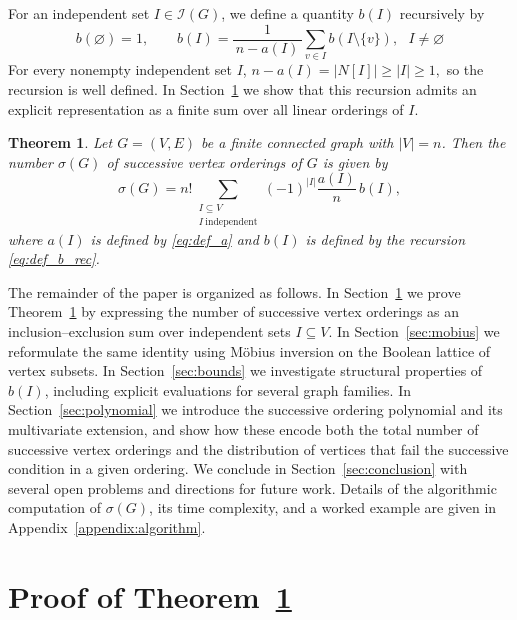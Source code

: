 \documentclass[11pt,a4paper]{article}
\numberwithin{equation}{section}
\theoremstyle{plain}
\newtheorem{theorem}{Theorem}[section]
\theoremstyle{definition}
\theoremstyle{remark}
\begin{document}
For an independent set \(I\in \mathcal I(G)\), we define a quantity \(b(I)\)
recursively by
\begin{equation}\label{eq:def_b_rec}
b(\varnothing)=1,
\qquad
b(I)
=
\frac{1}{\,n-a(I)\,}
\sum_{v\in I} b(I\setminus\{v\}),
\ \ \ I\neq\varnothing
\end{equation}
For every nonempty independent set \(I\),
\(
n-a(I)=|N[I]|\ge |I|\ge 1,
\)
so the recursion is well defined.
In Section~\ref{sec:proof} we show that this recursion admits an explicit representation as a finite sum over all linear orderings of \(I\).

\begin{theorem}\label{thm:main}
Let \(G=(V,E)\) be a finite connected graph with \(|V|=n\).
Then the number \(\sigma(G)\) of successive vertex orderings of \(G\) is given by
\begin{equation}\label{eqn:main}
\sigma(G)
=
n!
\sum_{\substack{I\subseteq V\\ I\ \mathrm{independent}}}
(-1)^{|I|}
\frac{a(I)}{n}\,b(I),
\end{equation}
where \(a(I)\) is defined by \eqref{eq:def_a} and \(b(I)\) is defined by the recursion
\eqref{eq:def_b_rec}.
\end{theorem}

The remainder of the paper is organized as follows. In Section~\ref{sec:proof} we prove Theorem~\ref{thm:main} by expressing the number of successive vertex orderings as an inclusion--exclusion sum over independent sets \(I\subseteq V\).
In Section~\ref{sec:mobius} we reformulate the same identity using Möbius inversion on the Boolean lattice of vertex subsets. 
In Section~\ref{sec:bounds} we investigate structural properties of \(b(I)\), including explicit evaluations for several graph families.
In Section~\ref{sec:polynomial} we introduce the successive ordering polynomial and its multivariate extension, and show how these encode both the total number of successive vertex orderings and the distribution of vertices that fail the successive condition in a given ordering. 
We conclude in Section~\ref{sec:conclusion} with several open problems and directions for future work.
Details of the algorithmic computation of $\sigma(G)$, its time complexity, and a worked example are given in Appendix~\ref{appendix:algorithm}. 

\section{Proof of Theorem~\ref{thm:main}} 
\label{sec:proof}
\end{document}
